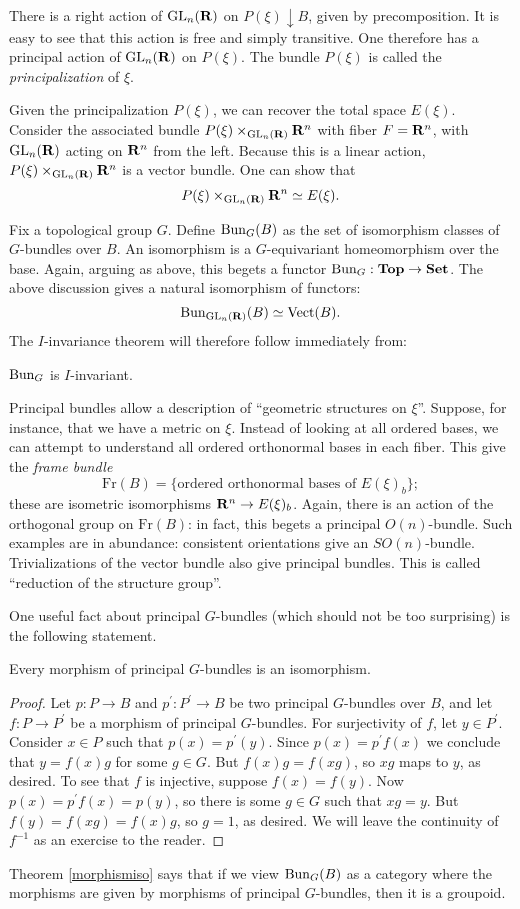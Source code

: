 There is a right action of $\mathrm{GL}_n(\mathbf R)$ on $P(\xi)\downarrow B$, given by
precomposition. It is easy to see that this action is free and simply
transitive. One therefore has a {principal action} of $\mathrm{GL}_n(\mathbf R)$ on $P(\xi)$.
The bundle $P(\xi)$ is called the \emph{principalization} of $\xi$. 

Given the principalization $P(\xi)$, we can recover the total space $E(\xi)$.
Consider the associated bundle $P(\xi)\times_{\mathrm{GL}_n(\mathbf R)}\mathbf R^n$ with fiber $F =
\mathbf R^n$, with $\mathrm{GL}_n(\mathbf R)$ acting on $\mathbf R^n$ from the left. Because this is a
linear action, $P(\xi)\times_{\mathrm{GL}_n(\mathbf R)}\mathbf R^n$ is a vector bundle. One can
show that
$$P(\xi)\times_{\mathrm{GL}_n(\mathbf R)}\mathbf R^n\simeq E(\xi).$$

Fix a topological group $G$. Define $\mathrm{Bun}_G(B)$ as the set of isomorphism
classes of $G$-bundles over $B$. An isomorphism is a $G$-equivariant
homeomorphism over the base. Again, arguing as above, this begets a functor
$\mathrm{Bun}_G:\mathbf{Top}\to\mathbf{Set}$. The above discussion gives a natural isomorphism of
functors:
$$\mathrm{Bun}_{\mathrm{GL}_n(\mathbf R)}(B) \simeq \operatorname{Vect}(B).$$
The $I$-invariance theorem will therefore follow immediately from:
\begin{theorem}
    $\mathrm{Bun}_G$ is $I$-invariant.
\end{theorem}
\begin{remark}
    Principal bundles allow a description of ``geometric structures on $\xi$''.
    Suppose, for instance, that we have a metric on $\xi$. Instead of looking
    at all ordered bases, we can attempt to understand all ordered orthonormal
    bases in each fiber. This give the \emph{frame bundle}
    $$\mathrm{Fr}(B) = \{\text{ordered orthonormal bases of }E(\xi)_b\};$$
    these are isometric isomorphisms $\mathbf R^n\to E(\xi)_b$. Again, there is an
    action of the orthogonal group on $\mathrm{Fr}(B)$: in fact, this begets a
    principal $O(n)$-bundle. Such examples are in abundance: consistent
    orientations give an $SO(n)$-bundle. Trivializations of the vector bundle
    also give principal bundles. This is called ``reduction of the structure
    group''.
\end{remark}
One useful fact about principal $G$-bundles (which should not be too
surprising) is the following statement.
\begin{theorem}\label{morphismiso}
    Every morphism of principal $G$-bundles is an isomorphism.
\end{theorem}
\begin{proof}
    Let $p:P\to B$ and $p^\prime:P^\prime\to B$ be two principal $G$-bundles
    over $B$, and let $f:P\to P^\prime$ be a morphism of principal $G$-bundles.
    For surjectivity of $f$, let $y\in P^\prime$. Consider $x\in P$ such that
    $p(x) = p^\prime(y)$. Since $p(x) = p^\prime f(x)$ we conclude that $y =
    f(x)g$ for some $g\in G$. But $f(x)g = f(xg)$, so $xg$ maps to $y$, as
    desired.  To see that $f$ is injective, suppose $f(x) = f(y)$. Now $p(x) =
    p^\prime f(x) = p(y)$, so there is some $g\in G$ such that $xg = y$. But
    $f(y) = f(xg) = f(x)g$, so $g=1$, as desired.  We will leave the continuity
    of $f^{-1}$ as an exercise to the reader.
\end{proof}
Theorem \ref{morphismiso} says that if we view $\mathrm{Bun}_G(B)$ as a category where
the morphisms are given by morphisms of principal $G$-bundles, then it is a
groupoid.
